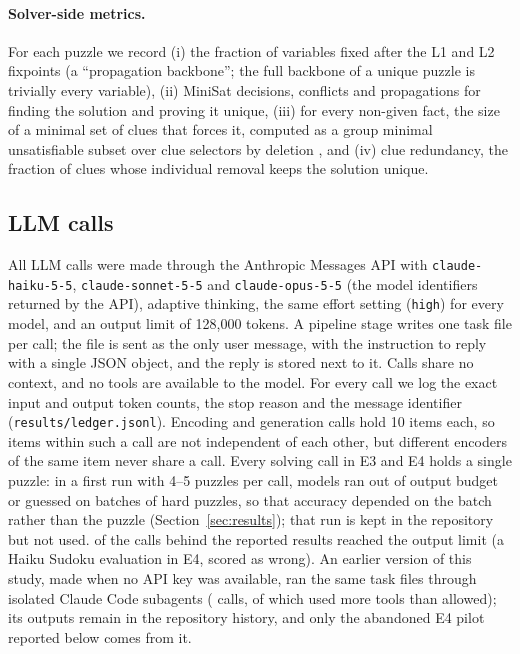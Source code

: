 \paragraph{Solver-side metrics.} For each puzzle we record (i) the fraction of variables fixed after the L1 and L2 fixpoints (a ``propagation backbone''; the full backbone of a unique puzzle is trivially every variable), (ii) MiniSat decisions, conflicts and propagations for finding the solution and proving it unique, (iii) for every non-given fact, the size of a minimal set of clues that forces it, computed as a group minimal unsatisfiable subset over clue selectors by deletion \citep{liffiton2008mus,bogaerts2021stepwise}, and (iv) clue redundancy, the fraction of clues whose individual removal keeps the solution unique.

\subsection{LLM calls}
\label{sec:llmcalls}

All LLM calls were made through the Anthropic Messages API with \texttt{claude-haiku-5-5}, \texttt{claude-sonnet-5-5} and \texttt{claude-opus-5-5} (the model identifiers returned by the API), adaptive thinking, the same effort setting (\texttt{high}) for every model, and an output limit of 128{,}000 tokens. A pipeline stage writes one task file per call; the file is sent as the only user message, with the instruction to reply with a single JSON object, and the reply is stored next to it. Calls share no context, and no tools are available to the model. For every call we log the exact input and output token counts, the stop reason and the message identifier (\texttt{results/ledger.jsonl}). Encoding and generation calls hold 10 items each, so items within such a call are not independent of each other, but different encoders of the same item never share a call. Every solving call in E3 and E4 holds a single puzzle: in a first run with 4--5 puzzles per call, models ran out of output budget or guessed on batches of hard puzzles, so that accuracy depended on the batch rather than the puzzle (Section~\ref{sec:results}); that run is kept in the repository but not used. \NMaxTokens{} of the \NCallsFinal{} calls behind the reported results reached the output limit (a Haiku Sudoku evaluation in E4, scored as wrong). An earlier version of this study, made when no API key was available, ran the same task files through isolated Claude Code subagents (\NCallsSubagent{} calls, \NViolationsSubagent{} of which used more tools than allowed); its outputs remain in the repository history, and only the abandoned E4 pilot reported below comes from it.

